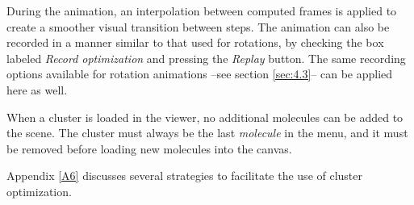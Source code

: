 \documentclass[10pt]{article}
\begin{document}
During the animation, an interpolation between computed frames is applied to create a  
smoother visual transition between steps.  
The animation can also be recorded  
in a manner similar to that used for rotations,  
by checking the box labeled {\it Record optimization} and pressing the {\it Replay} button.  
The same recording options available for rotation animations --see section \ref{sec:4.3}--  
can be applied here as well.

When a cluster is loaded in the viewer, no additional molecules can be added to the scene.  
The cluster must always be the last {\it molecule} in the menu, and it must be removed  
before loading new molecules into the canvas.

Appendix \ref{A6} discusses several strategies to facilitate the use of cluster optimization.
\end{document}
